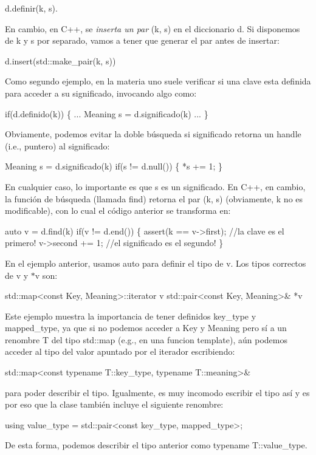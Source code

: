 \begin{DoxyCode}
d.definir(k, s).
\end{DoxyCode}
 En cambio, en C++, se {\itshape inserta un par} {\ttfamily (k, s)} en el diccionario {\ttfamily d}. Si disponemos de {\ttfamily k} y {\ttfamily s} por separado, vamos a tener que generar el par antes de insertar\+: 
\begin{DoxyCode}
d.insert(std::make\_pair(k, s))
\end{DoxyCode}


Como segundo ejemplo, en la materia uno suele verificar si una clave esta definida para acceder a su significado, invocando algo como\+: 
\begin{DoxyCode}
if(d.definido(k)) \{ ... Meaning s = d.significado(k) ... \}
\end{DoxyCode}
 Obviamente, podemos evitar la doble búsqueda si {\ttfamily significado} retorna un handle (i.\+e., puntero) al significado\+: 
\begin{DoxyCode}
Meaning s = d.significado(k)
if(s != d.null()) \{ *s += 1; \}
\end{DoxyCode}
 En cualquier caso, lo importante es que {\ttfamily s} es un significado. En C++, en cambio, la función de búsqueda (llamada {\ttfamily find}) retorna el par {\ttfamily (k, s)} (obviamente, {\ttfamily k} no es modificable), con lo cual el código anterior se transforma en\+: 
\begin{DoxyCode}
\textcolor{keyword}{auto} v = d.find(k)
\textcolor{keywordflow}{if}(v != d.end()) \{
   assert(k == v->first); \textcolor{comment}{//la clave es el primero!}
   v->second += 1;        \textcolor{comment}{//el significado es el segundo!}
\}
\end{DoxyCode}


En el ejemplo anterior, usamos {\ttfamily auto} para definir el tipo de {\ttfamily v}. Los tipos correctos de {\ttfamily v} y {\ttfamily $\ast$v} son\+: 
\begin{DoxyCode}
std::map<const Key, Meaning>::iterator v
std::pair<const Key, Meaning>& *v
\end{DoxyCode}
 Este ejemplo muestra la importancia de tener definidos {\ttfamily key\+\_\+type} y {\ttfamily mapped\+\_\+type}, ya que si no podemos acceder a Key y Meaning pero sí a un renombre T del tipo std\+::map (e.\+g., en una funcion template), aún podemos acceder al tipo del valor apuntado por el iterador escribiendo\+: 
\begin{DoxyCode}
std::map<const typename T::key\_type, typename T::meaning>&
\end{DoxyCode}
 para poder describir el tipo. Igualmente, es muy incomodo escribir el tipo así y es por eso que la clase también incluye el siguiente renombre\+: 
\begin{DoxyCode}
\textcolor{keyword}{using} value\_type = std::pair<const key\_type, mapped\_type>;
\end{DoxyCode}
 De esta forma, podemos describir el tipo anterior como {\ttfamily typename T\+::value\+\_\+type}.

